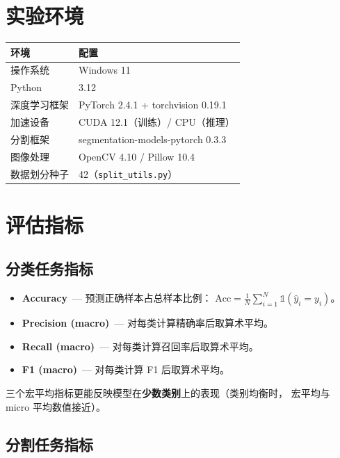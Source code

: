 \documentclass[12pt, a4paper, openany]{ctexbook}
\begin{document}
\section{实验环境}

\begin{center}
\begin{tabular}{lL{8cm}}
  \toprule
  \textbf{环境} & \textbf{配置} \\
  \midrule
  操作系统    & Windows 11 \\
  Python      & 3.12 \\
  深度学习框架 & PyTorch 2.4.1 + torchvision 0.19.1 \\
  加速设备    & CUDA 12.1（训练）/ CPU（推理） \\
  分割框架    & segmentation-models-pytorch 0.3.3 \\
  图像处理    & OpenCV 4.10 / Pillow 10.4 \\
  数据划分种子 & 42（\texttt{split\_utils.py}） \\
  \bottomrule
\end{tabular}
\end{center}

\section{评估指标}

\subsection{分类任务指标}

\begin{itemize}[leftmargin=*]
  \item \textbf{Accuracy}\ — 预测正确样本占总样本比例：
        $\text{Acc} = \frac{1}{N}\sum_{i=1}^{N}\mathbb{1}(\hat{y}_i = y_i)$。
  \item \textbf{Precision (macro)}\ — 对每类计算精确率后取算术平均。
  \item \textbf{Recall (macro)}\ — 对每类计算召回率后取算术平均。
  \item \textbf{F1 (macro)}\ — 对每类计算 F1 后取算术平均。
\end{itemize}

三个宏平均指标更能反映模型在\textbf{少数类别}上的表现（类别均衡时，
宏平均与 micro 平均数值接近）。

\subsection{分割任务指标}
\end{document}

